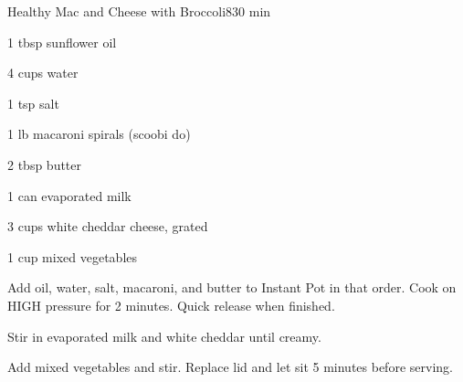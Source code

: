\begin{recipebox}{Healthy Mac and Cheese with Broccoli}{8}{30 min}
  \begin{ingredients}
    \item 1 tbsp sunflower oil
    \item 4 cups water
    \item 1 tsp salt
    \item 1 lb macaroni spirals (scoobi do)
    \item 2 tbsp butter
    \item 1 can evaporated milk
    \item 3 cups white cheddar cheese, grated
    \item 1 cup mixed vegetables
  \end{ingredients}

  \begin{method}
    \item Add oil, water, salt, macaroni, and butter to Instant Pot in that order.
          Cook on HIGH pressure for 2 minutes. Quick release when finished.
    \item Stir in evaporated milk and white cheddar until creamy.
    \item Add mixed vegetables and stir. Replace lid and let sit 5 minutes before serving.           
  \end{method}
\end{recipebox}

